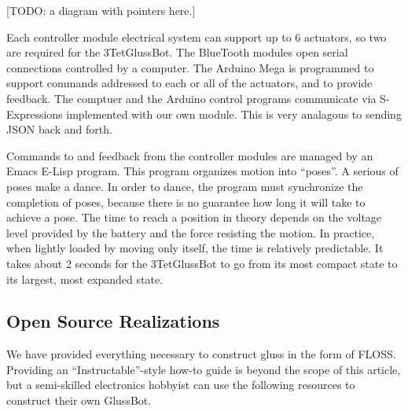 \documentclass[12pt]{article}
\begin{document}
[TODO: a diagram with pointers here.]

Each controller module electrical system can support up to 6 actuators, so two are required for the 3TetGlussBot.
The BlueTooth modules open serial connections controlled by a computer.
The Arduino Mega is programmed to support commands addressed to each or all of the actuators, and
to provide feedback. The comptuer and the Arduino control programs communicate via S-Expressions
implemented with our own module. This is very analagous to sending JSON back and forth.

Commands to and feedback from the controller modules are managed by an Emacs E-Lisp program.
This program organizes motion into ``poses''. A serious of poses make a dance.
In order to dance, the program must synchronize the completion of poses, because there is no
guarantee how long it will take to achieve a pose. The time to reach a position in theory
depends on the voltage level provided by the battery and the force resisting the motion.
In practice, when lightly loaded by moving only itself, the time is relatively predictable. It takes
about 2 seconds for the 3TetGlussBot to go from its most compact state to its largest, most expanded state.

\subsection{Open Source Realizations}


We have provided everything necessary to construct gluss in the form of FLOSS. Providing an ``Instructable''-style
how-to guide is beyond the scope of this article, but a semi-skilled electronics hobbyist can use the following resources to construct their own GlussBot.
\end{document}
